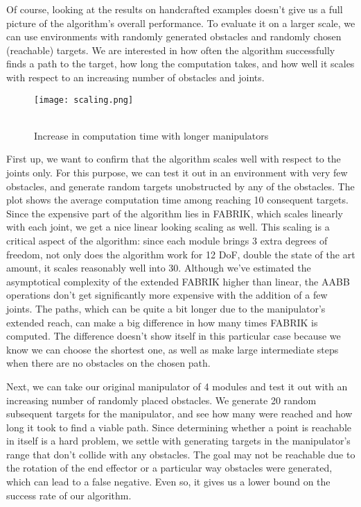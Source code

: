 Of course, looking at the results on handcrafted examples doesn't give us a full picture of the algorithm's overall performance. To evaluate it on a larger scale, we can use environments with randomly generated obstacles and randomly chosen (reachable) targets. We are interested in how often the algorithm successfully finds a path to the target, how long the computation takes, and how well it scales with respect to an increasing number of obstacles and joints.

\begin{wrapfigure}{r}{0.4\textwidth}
  \centering
  \texttt{[image: scaling.png]}
  \caption{\\Increase in computation time with longer manipulators}
\end{wrapfigure}

First up, we want to confirm that the algorithm scales well with respect to the joints only. For this purpose, we can test it out in an environment with very few obstacles, and generate random targets unobstructed by any of the obstacles. The plot shows the average computation time among reaching 10 consequent targets. Since the expensive part of the algorithm lies in FABRIK, which scales linearly with each joint, we get a nice linear looking scaling as well. This scaling is a critical aspect of the algorithm: since each module brings 3 extra degrees of freedom, not only does the algorithm work for 12 DoF, double the state of the art amount, it scales reasonably well into 30. Although we've estimated the asymptotical complexity of the extended FABRIK higher than linear, the AABB operations don't get significantly more expensive with the addition of a few joints.
The paths, which can be quite a bit longer due to the manipulator's extended reach, can make a big difference in how many times FABRIK is computed. The difference doesn't show itself in this particular case because we know we can choose the shortest one, as well as make large intermediate steps when there are no obstacles on the chosen path.



Next, we can take our original manipulator of 4 modules and test it out with an increasing number of randomly placed obstacles. We generate 20 random subsequent targets for the manipulator, and see how many were reached and how long it took to find a viable path. Since determining whether a point is reachable in itself is a hard problem, we settle with generating targets in the manipulator's range that don't collide with any obstacles. The goal may not be reachable due to the rotation of the end effector or a particular way obstacles were generated, which can lead to a false negative. Even so, it gives us a lower bound on the success rate of our algorithm.

